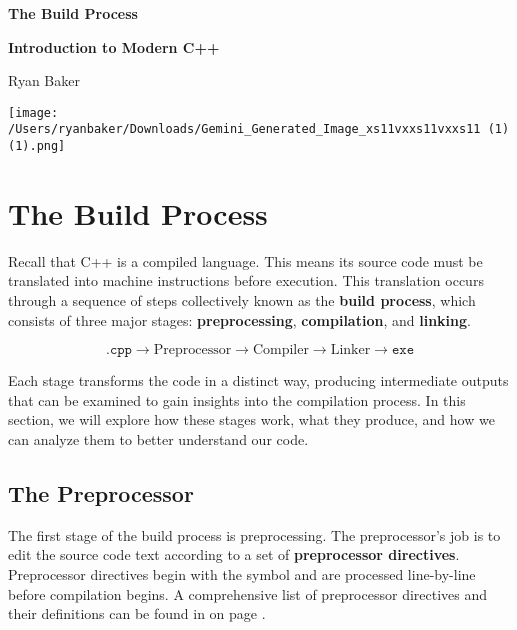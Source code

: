 \documentclass[12pt]{article}
\begin{document}
\begin{center}

\Huge\textbf{The Build Process}

\vspace{1em}

\LARGE\textbf{Introduction to Modern C++}

\vspace{1em}

\Large{Ryan Baker}

\vfill

\texttt{[image: /Users/ryanbaker/Downloads/Gemini\_Generated\_Image\_xs11vxxs11vxxs11 (1) (1).png]}

\end{center}

\vfill

\tableofcontents

\pagebreak

\section{The Build Process}

\noindent
Recall that C++ is a compiled language.
This means its source code must be translated into machine instructions before execution.
This translation occurs through a sequence of steps collectively known as the \textbf{build process}, which consists of three major stages: \textbf{preprocessing}, \textbf{compilation}, and \textbf{linking}.

\[\texttt{.cpp} \rightarrow \boxed{\textrm{Preprocessor}} \rightarrow \boxed{\textrm{Compiler}} \rightarrow \boxed{\textrm{Linker}} \rightarrow \texttt{exe}\]

\noindent
Each stage transforms the code in a distinct way, producing intermediate outputs that can be examined to gain insights into the compilation process.
In this section, we will explore how these stages work, what they produce, and how we can analyze them to better understand our code.

\subsection{The Preprocessor}

The first stage of the build process is preprocessing.
The preprocessor's job is to edit the source code text according to a set of \textbf{preprocessor directives}.
Preprocessor directives begin with the \inlinecxx{#} symbol and are processed line-by-line before compilation begins.
A comprehensive list of preprocessor directives and their definitions can be found in on page \pageref{tab:preprocessor-directives}.
\end{document}

